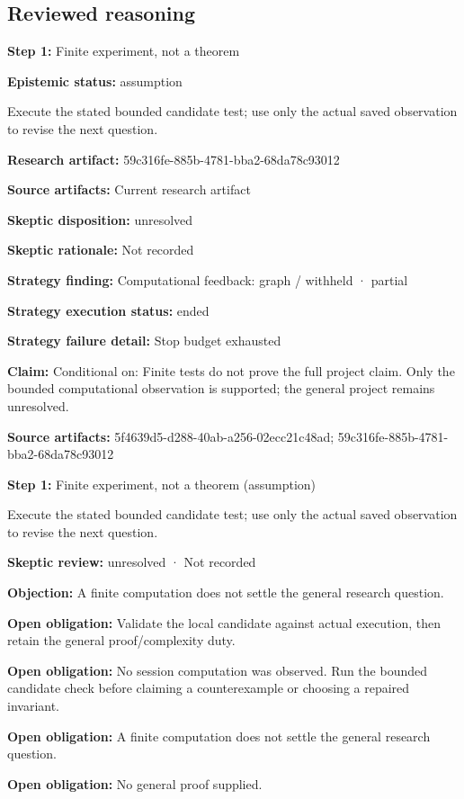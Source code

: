 \documentclass[11pt]{article}
\begin{document}
\subsection{Reviewed reasoning}
\textbf{Step 1:} Finite experiment, not a theorem\par
\textbf{Epistemic status:} assumption\par
Execute the stated bounded candidate test; use only the actual saved observation to revise the next question.\par
\textbf{Research artifact:} 59c316fe-885b-4781-bba2-68da78c93012\par
\textbf{Source artifacts:} Current research artifact\par
\textbf{Skeptic disposition:} unresolved\par
\textbf{Skeptic rationale:} Not recorded\par
\textbf{Strategy finding:} Computational feedback: graph / withheld · partial\par
\textbf{Strategy execution status:} ended\par
\textbf{Strategy failure detail:} Stop budget exhausted\par
\textbf{Claim:} Conditional on: Finite tests do not prove the full project claim. Only the bounded computational observation is supported; the general project remains unresolved.\par
\textbf{Source artifacts:} 5f4639d5-d288-40ab-a256-02ecc21c48ad; 59c316fe-885b-4781-bba2-68da78c93012\par
\textbf{Step 1:} Finite experiment, not a theorem (assumption)\par
Execute the stated bounded candidate test; use only the actual saved observation to revise the next question.\par
\textbf{Skeptic review:} unresolved · Not recorded\par
\textbf{Objection:} A finite computation does not settle the general research question.\par
\textbf{Open obligation:} Validate the local candidate against actual execution, then retain the general proof/complexity duty.\par
\textbf{Open obligation:} No session computation was observed. Run the bounded candidate check before claiming a counterexample or choosing a repaired invariant.\par
\textbf{Open obligation:} A finite computation does not settle the general research question.\par
\textbf{Open obligation:} No general proof supplied.\par
\end{document}
